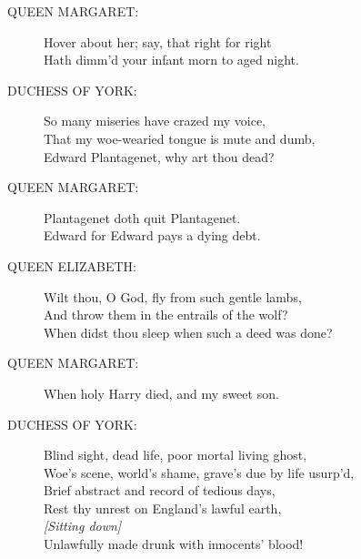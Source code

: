 \documentclass{article}
\begin{document}
\begin{description}
\item[QUEEN MARGARET:] 
\hspace{1pt}Hover about her; say, that right for right\\
\hspace{1pt}Hath dimm'd your infant morn to aged night.\\
\end{description}
\begin{description}
\item[DUCHESS OF YORK:] 
\hspace{1pt}So many miseries have crazed my voice,\\
\hspace{1pt}That my woe-wearied tongue is mute and dumb,\\
\hspace{1pt}Edward Plantagenet, why art thou dead?\\
\end{description}
\begin{description}
\item[QUEEN MARGARET:] 
\hspace{1pt}Plantagenet doth quit Plantagenet.\\
\hspace{1pt}Edward for Edward pays a dying debt.\\
\end{description}
\begin{description}
\item[QUEEN ELIZABETH:] 
\hspace{1pt}Wilt thou, O God, fly from such gentle lambs,\\
\hspace{1pt}And throw them in the entrails of the wolf?\\
\hspace{1pt}When didst thou sleep when such a deed was done?\\
\end{description}
\begin{description}
\item[QUEEN MARGARET:] 
\hspace{1pt}When holy Harry died, and my sweet son.\\
\end{description}
\begin{description}
\item[DUCHESS OF YORK:] 
\hspace{1pt}Blind sight, dead life, poor mortal living ghost,\\
\hspace{1pt}Woe's scene, world's shame, grave's due by life usurp'd,\\
\hspace{1pt}Brief abstract and record of tedious days,\\
\hspace{1pt}Rest thy unrest on England's lawful earth,\\
{\it [Sitting down]}\\
\hspace{1pt}Unlawfully made drunk with innocents' blood!\\
\end{description}
\end{document}
